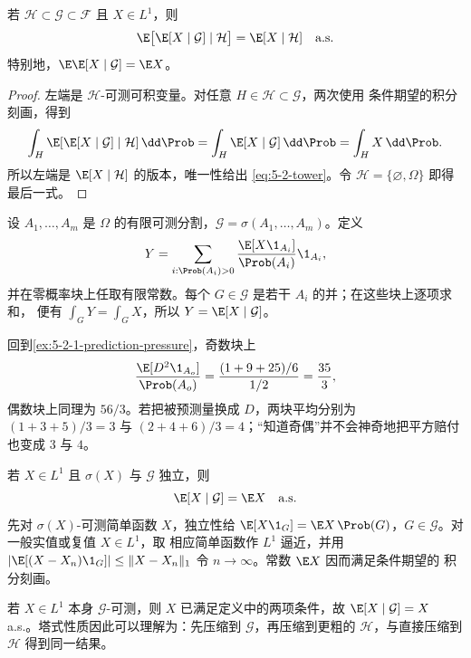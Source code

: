 \begin{theorem}[塔式性质]\label{theorem:5-2-1-4}
若 $\mathcal H\subset\mathcal G\subset\mathcal F$ 且 $X\in L^1$，则
\begin{equation}\label{eq:5-2-tower}
 \E\bigl[\E[X\mid\mathcal G]\mid\mathcal H\bigr]
 =\E[X\mid\mathcal H]\quad\text{a.s.}
\end{equation}
特别地，$\E\E[X\mid\mathcal G]=\E X$。
\end{theorem}

\begin{proof}
左端是 $\mathcal H$-可测可积变量。对任意 $H\in\mathcal H\subset\mathcal G$，两次使用
条件期望的积分刻画，得到
\[
 \int_H\E[\E[X\mid\mathcal G]\mid\mathcal H]\,\dd\Prob
 =\int_H\E[X\mid\mathcal G]\,\dd\Prob
 =\int_HX\,\dd\Prob.
\]
所以左端是 $\E[X\mid\mathcal H]$ 的版本，唯一性给出 \eqref{eq:5-2-tower}。令
$\mathcal H=\{\varnothing,\Omega\}$ 即得最后一式。
\end{proof}

\begin{example}[有限分割]\label{ex:5-2-1-1}
设 $A_1,\dots,A_m$ 是 $\Omega$ 的有限可测分割，$\mathcal G=\sigma(A_1,\dots,A_m)$。定义
\[
 Y=\sum_{i:\Prob(A_i)>0}
   \frac{\E[X\1_{A_i}]}{\Prob(A_i)}\1_{A_i},
\]
并在零概率块上任取有限常数。每个 $G\in\mathcal G$ 是若干 $A_i$ 的并；在这些块上逐项求和，
便有 $\int_GY=\int_GX$，所以 $Y=\E[X\mid\mathcal G]$。

回到\cref{ex:5-2-1-prediction-pressure}，奇数块上
\[
 \frac{\E[D^2\1_{A_o}]}{\Prob(A_o)}
 =\frac{(1+9+25)/6}{1/2}=\frac{35}{3},
\]
偶数块上同理为 $56/3$。若把被预测量换成 $D$，两块平均分别为
$(1+3+5)/3=3$ 与 $(2+4+6)/3=4$；“知道奇偶”并不会神奇地把平方赔付也变成 $3$ 与 $4$。
\end{example}

\begin{example}[独立信息]\label{ex:5-2-1-2}
若 $X\in L^1$ 且 $\sigma(X)$ 与 $\mathcal G$ 独立，则
\[
 \E[X\mid\mathcal G]=\E X\quad\text{a.s.}
\]
先对 $\sigma(X)$-可测简单函数 $X$，独立性给
$\E[X\1_G]=\E X\,\Prob(G)$，$G\in\mathcal G$。对一般实值或复值 $X\in L^1$，取
相应简单函数作 $L^1$ 逼近，并用
$|\E[(X-X_n)\1_G]|\leq\|X-X_n\|_1$ 令 $n\to\infty$。常数 $\E X$ 因而满足条件期望的
积分刻画。
\end{example}

\begin{example}[已知变量]\label{ex:5-2-1-3}
若 $X\in L^1$ 本身 $\mathcal G$-可测，则 $X$ 已满足定义中的两项条件，故
$\E[X\mid\mathcal G]=X$ a.s.。塔式性质因此可以理解为：先压缩到 $\mathcal G$，再压缩到更粗的
$\mathcal H$，与直接压缩到 $\mathcal H$ 得到同一结果。
\end{example}

